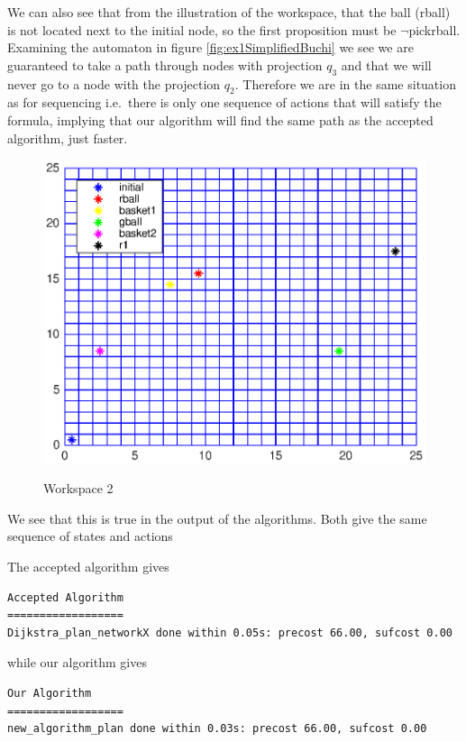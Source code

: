 We can also see that from the illustration of the workspace, that the ball (rball) is not located next to the initial node, so the first proposition must be $\neg$pickrball. Examining the automaton in figure \ref{fig:ex1SimplifiedBuchi} we see we are guaranteed to take a path through nodes with projection $q_3$ and that we will never go to a node with the projection $q_2$. Therefore we are in the same situation as for sequencing i.e.\ there is only one sequence of actions that will satisfy the formula, implying that our algorithm will find the same path as the accepted algorithm, just faster. 

\begin{figure}[!htb]
\centering
\includegraphics[scale=1]{workspace2.eps}
\label{fig:workspace2}
\caption{Workspace 2}
\end{figure}

We see that this is true in the output of the algorithms. Both give the same sequence of states and actions


The accepted algorithm gives 
\begingroup
\fontsize{9pt}{12pt}\selectfont
\begin{lstlisting}
Accepted Algorithm
==================
Dijkstra_plan_networkX done within 0.05s: precost 66.00, sufcost 0.00
\end{lstlisting}
\endgroup


while our algorithm gives 
\begingroup
\fontsize{9pt}{12pt}\selectfont
\begin{lstlisting}
Our Algorithm
==================
new_algorithm_plan done within 0.03s: precost 66.00, sufcost 0.00
\end{lstlisting}
\endgroup


